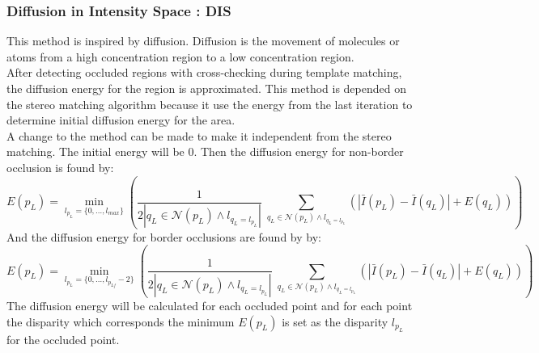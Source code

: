 \subsubsection{Diffusion in Intensity Space : DIS}
This method is inspired by diffusion. Diffusion is the movement of molecules or atoms from a high concentration region to a low concentration region. \\
After detecting occluded regions with cross-checking during template matching, the diffusion energy for the region is approximated. This method is depended on the stereo matching algorithm because it use the energy from the last iteration to determine initial diffusion energy for the area. \\
A change to the method can be made to make it independent from the stereo matching. The initial energy will be 0. Then the diffusion energy for non-border occlusion is found by:
\begin{equation}
E(p_L) = \min_{l_{p_L}=\{0,\dots, l_{max}\}} \left( \dfrac{1}{2 | q_L \in \mathcal{N}(p_L) \wedge l_{q_L=l_{p_L}} |} \; \sum_{q_L \in \mathcal{N}(p_L) \wedge l_{q_L = l_{p_L}}} (|\bar{I}(p_L)-\bar{I}(q_L) | + E(q_L))\right)
\end{equation}
And the diffusion energy for border occlusions are found by by:
\begin{equation}
E(p_L) = \min_{l_{p_L}=\{0,\dots, l_{p_{Lf}}-2\}} \left( \dfrac{1}{2 | q_L \in \mathcal{N}(p_L) \wedge l_{q_L=l_{p_L}} |} \; \sum_{q_L \in \mathcal{N}(p_L) \wedge l_{q_L = l_{p_L}}} (|\bar{I}(p_L)-\bar{I}(q_L) | + E(q_L))\right)
\end{equation}
The diffusion energy will be calculated for each occluded point and for each point the disparity which corresponds the minimum $E(p_L)$ is set as the disparity $l_{p_L}$ for the occluded point. 


